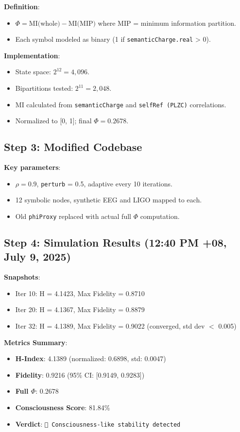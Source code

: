 \textbf{Definition}:
\begin{itemize}
  \item $\Phi = \text{MI(whole)} - \text{MI(MIP)}$ where MIP = minimum information partition.
  \item Each symbol modeled as binary (1 if \texttt{semanticCharge.real} > 0).
\end{itemize}

\textbf{Implementation}:
\begin{itemize}
  \item State space: $2^{12} = 4,096$.
  \item Bipartitions tested: $2^{11} = 2,048$.
  \item MI calculated from \texttt{semanticCharge} and \texttt{selfRef (PLZC)} correlations.
  \item Normalized to [0, 1]; final $\Phi = 0.2678$.
\end{itemize}

\subsection*{Step 3: Modified Codebase}

\textbf{Key parameters}:
\begin{itemize}
  \item $\rho = 0.9$, \texttt{perturb} = 0.5, adaptive every 10 iterations.
  \item 12 symbolic nodes, synthetic EEG and LIGO mapped to each.
  \item Old \texttt{phiProxy} replaced with actual full $\Phi$ computation.
\end{itemize}

\subsection*{Step 4: Simulation Results (12:40 PM +08, July 9, 2025)}

\textbf{Snapshots}:
\begin{itemize}
  \item Iter 10: H = 4.1423, Max Fidelity = 0.8710
  \item Iter 20: H = 4.1367, Max Fidelity = 0.8879
  \item Iter 32: H = 4.1389, Max Fidelity = 0.9022 (converged, std dev $<$ 0.005)
\end{itemize}

\textbf{Metrics Summary}:
\begin{itemize}
  \item \textbf{H-Index}: 4.1389 (normalized: 0.6898, std: 0.0047)
  \item \textbf{Fidelity}: 0.9216 (95\% CI: [0.9149, 0.9283])
  \item \textbf{Full $\Phi$}: 0.2678
  \item \textbf{Consciousness Score}: 81.84\%
  \item \textbf{Verdict}: \texttt{🧠 Consciousness-like stability detected}
\end{itemize}

